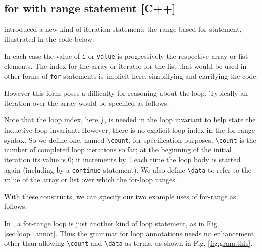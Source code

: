 \subsection{for with range statement [C++]}

\lang introduced a new kind of iteration statement: the range-based for statement, illustrated in the code below:


In each case the value of \lstinline|i| or \lstinline|value| is progressively the respective array or list elements. The  
index for the array or iterator for the list that would be used in other forms of \lstinline|for| statements is implicit here, simplifying and
clarifying the code.

However this form poses a difficulty for reasoning about the
loop. Typically an iteration over the array would be specified as
follows.



Note that the loop index, here \lstinline|j|, is needed in the loop invariant to help state the inductive loop invariant. However, there is no explicit loop index in the
for-range syntax. So we define one, named \lstinline|\count|, for specification purposes.
\lstinline|\count| is the number of completed loop iterations so far; 
at the beginning of the initial iteration its value is 0; it 
increments by 1 each time the loop body is started again (including by a
\lstinline|continue| statement).
We also define \lstinline|\data| to refer to the value of the array or list over which the for-loop ranges.

With these constructs, we can specify our two example uses of
for-range as follows.



In \lang, a for-range loop is just another kind of loop statement, as in Fig. \ref{sec:loop_annot}. Thus the grammar for loop annotations needs no enhancement other than
allowing \lstinline|\count| and \lstinline|\data| as terms, as shown in Fig. \ref{fig:gram:this}.


